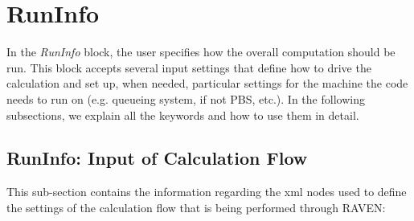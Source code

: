 \section{RunInfo}
In the \emph{RunInfo} block, the user specifies how the overall computation
should be run.
%
This block accepts several input settings that define how to drive the
calculation and set up, when needed, particular settings for the machine the
code needs to run on (e.g. queueing system, if not PBS, etc.).
%
In the following subsections, we explain all the keywords and how to use them in
detail.

\subsection{RunInfo: Input of Calculation Flow}
\label{subsec:runinfoCalcFlow}
This sub-section contains the information regarding the xml nodes used to define
the settings of the calculation flow that is being performed through RAVEN:

